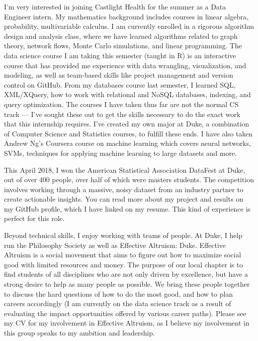 \documentclass[11pt, a4paper]{awesome-cv} %
\begin{document}
\makecvheader %

\makelettertitle %


\begin{cvletter}



I’m very interested in joining Castlight Health for the summer as a Data Engineer intern. My mathematics background includes courses in linear algebra, probability, multivariable calculus. I am currently enrolled in a rigorous algorithm design and analysis class, where we have learned algorithms related to graph theory, network flows, Monte Carlo simulations, and linear programming. The data science course I am taking this semester (taught in R) is an interactive course that has provided me experience with data wrangling, visualization, and modeling, as well as team-based skills like project management and version control on GitHub. From my databases course last semester, I learned SQL, XML/XQuery, how to work with relational and NoSQL databases, indexing, and query optimization. The courses I have taken thus far are not the normal CS track — I’ve sought these out to get the skills necessary to do the exact work that this internship requires. I’ve created my own major at Duke, a combination of Computer Science and Statistics courses, to fulfill these ends. I have also taken Andrew Ng’s Coursera course on machine learning which covers neural networks, SVMs, techniques for applying machine learning to large datasets and more. 

This April 2018, I won the American Statistical Association DataFest at Duke, out of over 400 people, over half of which were masters students. The competition involves working through a massive, noisy dataset from an industry partner to create actionable insights. You can read more about my project and results on my GitHub profile, which I have linked on my resume. This kind of experience is perfect for this role.

Beyond technical skills, I enjoy working with teams of people. At Duke, I help run the Philosophy Society as well as Effective Altruism: Duke. Effective Altruism is a social movement that aims to figure out how to maximize social good with limited resources and money. The purpose of our local chapter is to find students of all disciplines who are not only driven by excellence, but have a strong desire to help as many people as possible. We bring these people together to discuss the hard questions of how to do the most good, and how to plan careers accordingly (I am currently on the data science track as a result of evaluating the impact opportunities offered by various career paths). Please see my CV for my involvement in Effective Altruism, as I believe my involvement in this group speaks to my ambition and leadership.
	


\end{cvletter}
\end{document}
